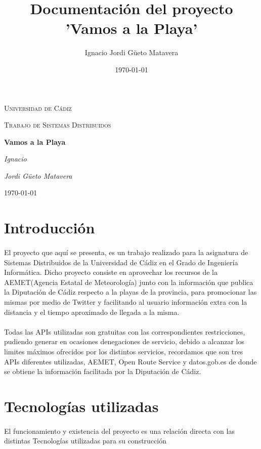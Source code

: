 \documentclass[a4paper,11pt]{article}
\title{Documentación del proyecto 'Vamos a la Playa'}
\author{Ignacio Jordi Güeto Matavera}
\date{\today}
\begin{document}
    \begin{titlepage}
	\centering
	{\scshape\LARGE Universidad de Cádiz \par}
	\vspace{1cm}
	{\scshape\Large Trabajo de Sistemas Distribuidos\par}
	\vspace{1.5cm}
	{\huge\bfseries Vamos a la Playa\par}
	\vspace{2cm}
	{\Large\itshape Ignacio\par}
	{\Large\itshape Jordi Güeto Matavera\par}
	\vfill
	{\large \today\par}
    \end{titlepage}
    \tableofcontents %
    \newpage
    \section{Introducción}
    \paragraph{}
    El proyecto que aquí se presenta, es un trabajo realizado para la asignatura de Sistemas Distribuidos de la Universidad de Cádiz en el Grado de Ingeniería Informática. Dicho proyecto consiste en aprovechar los recursos de la AEMET(Agencia Estatal de Meteorología) junto con la información que publica la Diputación de Cádiz respecto a la playas de la provincia, para promocionar las mismas por medio de Twitter y facilitando al usuario información extra con la distancia y el tiempo aproximado de llegada a la misma.
    \paragraph{}
    Todas las APIs utilizadas son gratuitas con las correspondientes restricciones, pudiendo generar en ocasiones denegaciones de servicio, debido a alcanzar los limites máximos ofrecidos por los distintos servicios, recordamos que son tres APIs diferentes utilizadas, AEMET, Open Route Service y datos.gob.es de donde se obtiene la información facilitada por la Diputación de Cádiz.
    
    \section{Tecnologías utilizadas}
    \paragraph{}
    El funcionamiento y existencia del proyecto es una relación directa con las distintas Tecnologías utilizadas para su construcción 
\end{document}
